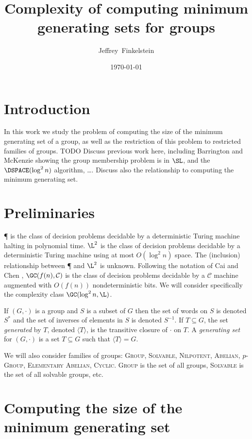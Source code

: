 \documentclass{article}
\title{Complexity of computing minimum generating sets for groups}
\author{Jef{}frey~Finkelstein}
\date{\today}
\newcommand{\gen}[1]{{\langle #1 \rangle}}
\begin{document}
\maketitle

\section{Introduction}

In this work we study the problem of computing the size of the minimum generating set of a group, as well as the restriction of this problem to restricted families of groups.
TODO Discuss previous work here, including Barrington and McKenzie showing the group membership problem is in $\SL$, and the $\DSPACE(\log^2 n)$ algorithm, \ldots.
Discuss also the relationship to computing the minimum generating set.

\section{Preliminaries}

\P{} is the class of decision problems decidable by a deterministic Turing machine halting in polynomial time.
$\L^2$ is the class of decision problems decidable by a deterministic Turing machine using at most $O(\log^2 n)$ space.
The (inclusion) relationship between \P{} and $\L^2$ is unknown.
Following the notation of Cai and Chen \cite{cc97}, $\GC(f(n), \mathcal{C})$ is the class of decision problems decidable by a $\mathcal{C}$ machine augmented with $O(f(n))$ nondeterministic bits.
We will consider specifically the complexity class $\GC(\log^2 n, \L)$.

If $(G, \cdot)$ is a group and $S$ is a subset of $G$ then the set of words on $S$ is denoted $S^*$ and the set of inverses of elements in $S$ is denoted $S^{-1}$.
If $T \subseteq G$, the set \emph{generated} by $T$, denoted $\gen{T}$, is the transitive closure of $\cdot$ on $T$.
A \emph{generating set} for $(G, \cdot)$ is a set $T \subseteq G$ such that $\gen{T} = G$.

We will also consider families of groups: \textsc{Group}, \textsc{Solvable}, \textsc{Nilpotent}, \textsc{Abelian}, \textsc{$p$-Group}, \textsc{Elementary Abelian}, \textsc{Cyclic}.
\textsc{Group} is the set of all groups, \textsc{Solvable} is the set of all solvable groups, etc.

\section{Computing the size of the minimum generating set}
\end{document}
